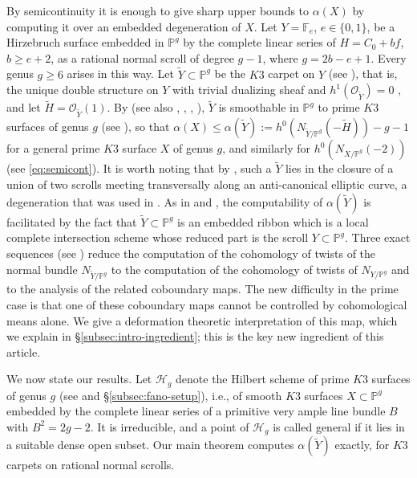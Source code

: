 \documentclass[11pt,twoside]{amsart}
\theoremstyle{plain}
\theoremstyle{definition}
\begin{document}
By semicontinuity it is enough to give sharp upper bounds to $\alpha(X)$ by computing it over an embedded degeneration of $X$. Let $Y = \mathbb{F}_e$, $e \in \{0,1\}$, be a Hirzebruch surface embedded in $\mathbb{P}^g$ by the complete linear series of $H = C_0+bf$, $b \geq e+2$, as a rational normal scroll of degree $g-1$, where $g = 2b-e+1$. Every genus $g \geq 6$ arises in this way. Let $\widetilde{Y} \subset \mathbb{P}^g$ be the $K3$ carpet on $Y$ (see ), that is, the unique double structure on $Y$ with trivial dualizing sheaf and $h^1(\mathcal{O}_{\widetilde{Y}}) = 0$ \cite{GP97}, and let $\widetilde{H} = \mathcal{O}_{\widetilde{Y}}(1)$. By \cite{GP97} (see also \cite{BMR21}, \cite{Gon06}, \cite{GGP10}, \cite{GGP13}), $\widetilde{Y}$ is smoothable in $\mathbb{P}^g$ to prime $K3$ surfaces of genus $g$ (see ), so that $\alpha(X) \leq \alpha(\widetilde{Y}) := h^0(N_{\widetilde{Y}/\mathbb{P}^g}(-\widetilde{H}))-g-1$ for a general prime $K3$ surface $X$ of genus $g$, and similarly for $h^0(N_{X/\mathbb{P}^g}(-2))$ (see \eqref{eq:semicont}). It is worth noting that by \cite{BGM24}, such a $\widetilde Y$ lies in the closure of a union of two scrolls meeting transversally along an anti-canonical elliptic curve, a degeneration that was used in \cite{CLM93}.  As in \cite{BM24} and \cite{BM25}, the computability of $\alpha(\widetilde{Y})$ is facilitated by the fact that $\widetilde{Y} \subset \mathbb{P}^g$ is an embedded ribbon which is a local complete intersection scheme whose reduced part is the scroll $Y \subset \mathbb{P}^g$. Three exact sequences (see ) reduce the computation of the cohomology of twists of the normal bundle $N_{\widetilde{Y}/\mathbb{P}^g}$ to the computation of the cohomology of twists of $N_{Y/\mathbb{P}^g}$ and to the analysis of the related coboundary maps. The new difficulty in the prime case is that one of these coboundary maps cannot be controlled by cohomological means alone. We give a deformation theoretic interpretation of this map, which we explain in \S\ref{subsec:intro-ingredient}; this is the key new ingredient of this article.

\smallskip

We now state our results. Let $\mathcal{H}_g$ denote the Hilbert scheme of prime $K3$ surfaces of genus $g$ (see  and \S\ref{subsec:fano-setup}), i.e., of smooth $K3$ surfaces $X \subset \mathbb{P}^g$ embedded by the complete linear series of a primitive very ample line bundle $B$ with $B^2 = 2g-2$. It is irreducible, and a point of $\mathcal{H}_g$ is called general if it lies in a suitable dense open subset. Our main theorem computes $\alpha(\widetilde{Y})$ exactly, for $K3$ carpets on rational normal scrolls.
\end{document}
